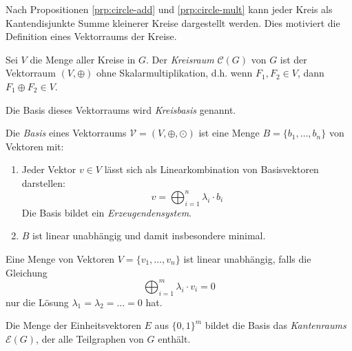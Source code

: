 \begin{remark}
    Nach Propositionen \ref{prp:circle-add} und \ref{prp:circle-mult} kann jeder Kreis als Kantendisjunkte Summe kleinerer Kreise dargestellt werden.
    Dies motiviert die Definition eines Vektorraums der Kreise.
\end{remark}

\begin{definition}[Kreisraum]
    Sei $ V $ die Menge aller Kreise in $ G $.
    Der \textit{Kreisraum} $ \mathcal{C}(G) $ von $ G $ ist der Vektorraum $ (V, \oplus) $ ohne Skalarmultiplikation, d.h. wenn $ F_1, F_2 \in V $, dann $ F_1 \oplus F_2 \in V $.

    Die Basis dieses Vektorraums wird \textit{Kreisbasis} genannt.
\end{definition}

\begin{definition}[Basis]
    Die \textit{Basis} eines Vektorraums $ \mathcal{V} = (V, \oplus, \odot) $ ist eine Menge $ B = \{ b_1, \dots, b_n \}$ von Vektoren mit:
    \begin{enumerate}
        \item Jeder Vektor $ v \in V $ lässt sich als Linearkombination von Basisvektoren darstellen:
        \begin{equation*}
            v = \bigoplus_{i = 1}^n \lambda_i \cdot b_i
        \end{equation*}
        Die Basis bildet ein \textit{Erzeugendensystem}.

        \item $ B $ ist linear unabhängig und damit insbesondere minimal.
    \end{enumerate}
\end{definition}

\begin{definition}
    Eine Menge von Vektoren $ V = \{ v_1, \dots, v_n \} $ ist linear unabhängig, falls die Gleichung
    \begin{equation*}
        \bigoplus_{i = 1}^m \lambda_i \cdot v_i = 0
    \end{equation*}
    nur die Lösung $ \lambda_1 = \lambda_2 = \dots = 0 $ hat.
\end{definition}

\begin{definition}[Kantenraum]
    Die Menge der Einheitsvektoren $ E $ aus $ \{ 0, 1\}^m $ bildet die Basis das \textit{Kantenraums} $ \mathcal{E}(G) $, der alle Teilgraphen von $ G $ enthält.
\end{definition}


